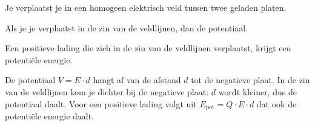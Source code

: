 \documentclass{ximera}
\begin{document}
\begin{question}
    Je verplaatst je in een homogeen elektrisch veld tussen twee geladen platen.

    Als je je verplaatst in de zin van de veldlijnen, dan  de potentiaal.

    Een positieve lading die zich in de zin van de veldlijnen verplaatst, krijgt een  potentiële energie.

    \begin{solution}\nl
        De potentiaal $V = E \cdot d$ hangt af van de afstand $d$ tot de negatieve plaat. In de zin van de veldlijnen kom je dichter bij de negatieve plaat: $d$ wordt kleiner, dus de potentiaal daalt. Voor een positieve lading volgt uit $E_{\text{pot}} = Q \cdot E \cdot d$ dat ook de potentiële energie daalt.
    \end{solution}
\end{question}
\end{document}
